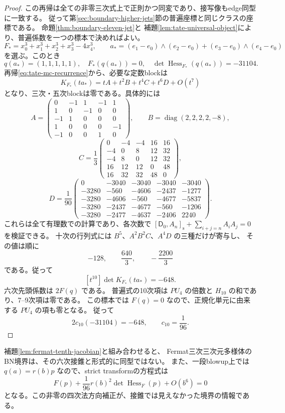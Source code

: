 \documentclass[a4paper,11pt]{ltjsarticle}
\theoremstyle{definition}
\begin{document}
\begin{proof}
この再帰は全ての非零三次式上で正則かつ同変であり、接写像もedge同型に一致する。
従って第\ref{sec:boundary-higher-jets}節の普遍座標と同じクラスの座標である。
命題\ref{thm:boundary-eleven-jet}と
補題\ref{lem:tate-universal-object}により、普遍係数を一つの標本で決めればよい。
\[
 F_*=x_0^3+x_1^3+x_2^3+x_3^3-4x_4^3,\qquad
 a_*=(e_1-e_0)\wedge(e_2-e_0)+(e_3-e_0)\wedge(e_4-e_0)
\]
を選ぶ。このとき
\[
 q(a_*)=(1,1,1,1,1),\quad F_*(q(a_*))=0,\quad
 \det\operatorname{Hess}_{F_*}(q(a_*))=-31104.
\]
再帰\eqref{eq:tate-mc-recurrence}から、必要な定数blockは
\[
 K_{F_*}(t a_*)=tA+t^2B+t^4C+t^6D+O(t^7)
\]
となり、三次・五次blockは零である。具体的には
\[
 A=\begin{pmatrix}
 0&-1&1&-1&1\\1&0&-1&0&0\\-1&1&0&0&0\\
 1&0&0&0&-1\\-1&0&0&1&0
 \end{pmatrix},\qquad
 B=\operatorname{diag}(2,2,2,2,-8),
\]
\[
 C=\frac13\begin{pmatrix}
 0&-4&-4&16&16\\-4&0&8&12&32\\-4&8&0&12&32\\
 16&12&12&0&48\\16&32&32&48&0
 \end{pmatrix},
\]
\[
 D=\frac1{90}\begin{pmatrix}
 0&-3040&-3040&-3040&-3040\\
 -3280&-560&-4606&-2437&-1277\\
 -3280&-4606&-560&-4677&-5837\\
 -3280&-2437&-4677&-560&-1206\\
 -3280&-2477&-4637&-2406&2240
 \end{pmatrix}.
\]
これらは全て有理数での計算であり、各次数で
$[\mathsf D_0,A_n]_{\mathrm s}+\sum_{i+j=n}A_iA_j=0$ を検証できる。
十次の行列式には $B^5$、$A^2B^2C$、$A^4D$ の三種だけが寄与し、
その値は順に
\[
                    -128,\qquad\frac{640}{3},\qquad-\frac{2200}{3}
\]
である。従って
\[
                  [t^{10}]\det K_{F_*}(ta_*)=-648.
\]
六次先頭係数は $2F(q)$ である。
普遍式の10次項は $P U_4$ の倍数と $H_{10}$ の和であり、7--9次項は零である。
この標本では $F(q)=0$ なので、正規化単元に由来する $P U_4$ の項も零となる。
従って
\[
           2c_{10}(-31104)=-648,\qquad c_{10}=\frac1{96}.
\]
\end{proof}

補題\ref{lem:fermat-tenth-jacobian}と組み合わせると、
Fermat三次三次元多様体のBN境界は、その六次接錐と形式的に同型ではない。
また、一段blowup上では $q(a)=r(b)p$ なので、strict transformの方程式は
\[
 F(p)+\frac1{96}r(b)^2\det\operatorname{Hess}_F(p)+O(b^6)=0
\]
となる。この非零の四次法方向補正が、接錐では見えなかった境界の情報である。
\end{document}
